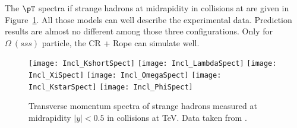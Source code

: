 \documentclass[ALICE,manyauthors]{StrinJet}
\begin{document}
The $\pT$ spectra if strange hadrons at midrapidity in \pp collisions at \seven are given in Figure~\ref{fig:InclParSpect}. All those models can well describe the experimental data. Prediction results are almost no different among those three configurations. Only for $\Omega~(sss)$ particle, the CR + Rope can simulate well.
\begin{figure}[ht]
	\begin{center}
		\texttt{[image: Incl\_KshortSpect]}
		\texttt{[image: Incl\_LambdaSpect]}
		\texttt{[image: Incl\_XiSpect]}
		\texttt{[image: Incl\_OmegaSpect]}
		\texttt{[image: Incl\_KstarSpect]}
		\texttt{[image: Incl\_PhiSpect]}
	\end{center}
	\caption{Transverse momentum spectra of strange hadrons measured at midrapidity $|y| < 0.5$ in \pp collisions at \seven TeV. Data taken from \cite{ALICE:2020jsh, Basak:2012jy, ALICE:2019hyb}.}
	\label{fig:InclParSpect}
\end{figure}

\end{document}
